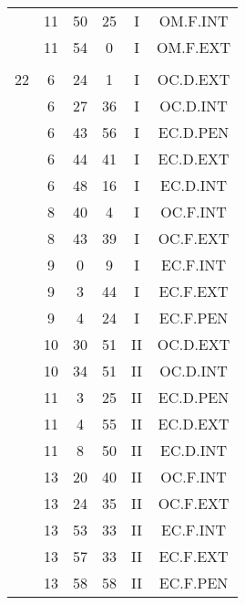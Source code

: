 \documentclass[12pt, a4paper]{article}
\begin{document}
\begin{multicols}{3}
{\begin{tabular}{c c c c c c}
	 	 	 	 & 11 & 50 & 25 & I & OM.F.INT\\%
	 	 	 	 & 11 & 54 & 0 & I & OM.F.EXT\\%
	 	 	 	 & & & & & \\%
	 	 	 	22 & 6 & 24 & 1 & I & OC.D.EXT\\%
	 	 	 	 & 6 & 27 & 36 & I & OC.D.INT\\%
	 	 	 	 & 6 & 43 & 56 & I & EC.D.PEN\\%
	 	 	 	 & 6 & 44 & 41 & I & EC.D.EXT\\%
	 	 	 	 & 6 & 48 & 16 & I & EC.D.INT\\%
	 	 	 	 & 8 & 40 & 4 & I & OC.F.INT\\%
	 	 	 	 & 8 & 43 & 39 & I & OC.F.EXT\\%
	 	 	 	 & 9 & 0 & 9 & I & EC.F.INT\\%
	 	 	 	 & 9 & 3 & 44 & I & EC.F.EXT\\%
	 	 	 	 & 9 & 4 & 24 & I & EC.F.PEN\\%
	 	 	 	 & 10 & 30 & 51 & II & OC.D.EXT\\%
	 	 	 	 & 10 & 34 & 51 & II & OC.D.INT\\%
	 	 	 	 & 11 & 3 & 25 & II & EC.D.PEN\\%
	 	 	 	 & 11 & 4 & 55 & II & EC.D.EXT\\%
	 	 	 	 & 11 & 8 & 50 & II & EC.D.INT\\%
	 	 	 	 & 13 & 20 & 40 & II & OC.F.INT\\%
	 	 	 	 & 13 & 24 & 35 & II & OC.F.EXT\\%
	 	 	 	 & 13 & 53 & 33 & II & EC.F.INT\\%
	 	 	 	 & 13 & 57 & 33 & II & EC.F.EXT\\%
	 	 	 	 & 13 & 58 & 58 & II & EC.F.PEN\\%
	 	 \end{tabular}
 	}
\end{multicols}
\end{document}
